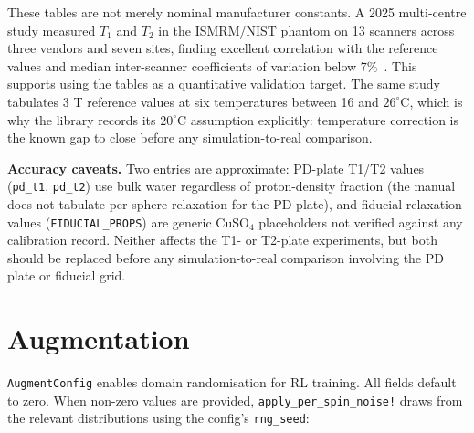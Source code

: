 These tables are not merely nominal manufacturer constants. A 2025
multi-centre study measured $T_1$ and $T_2$ in the ISMRM/NIST phantom on 13
scanners across three vendors and seven sites, finding excellent correlation
with the reference values and median inter-scanner coefficients of variation
below 7\%~\cite{pasini_multicenter_nist_t1t2_2025}. This supports using the
tables as a quantitative validation target. The same study tabulates 3 T
reference values at six temperatures between 16 and
\(26^{\circ}\text{C}\), which is why the library records its
\(20^{\circ}\text{C}\) assumption explicitly: temperature correction is the
known gap to close before any simulation-to-real comparison.

\textbf{Accuracy caveats.} Two entries are approximate: PD-plate T1/T2
values (\texttt{pd\_t1}, \texttt{pd\_t2}) use bulk water regardless of
proton-density fraction (the manual does not tabulate per-sphere
relaxation for the PD plate), and fiducial relaxation values
(\texttt{FIDUCIAL\_PROPS}) are generic CuSO\(_4\) placeholders not verified
against any calibration record. Neither affects the T1- or T2-plate
experiments, but both should be replaced before any simulation-to-real
comparison involving the PD plate or fiducial grid.

\hypertarget{augmentation}{%
\section{Augmentation}\label{augmentation}}

\texttt{AugmentConfig} enables domain randomisation for RL training. All
fields default to zero. When non-zero values are provided,
\texttt{apply\_per\_spin\_noise!} draws from the relevant distributions
using the config's \texttt{rng\_seed}:

